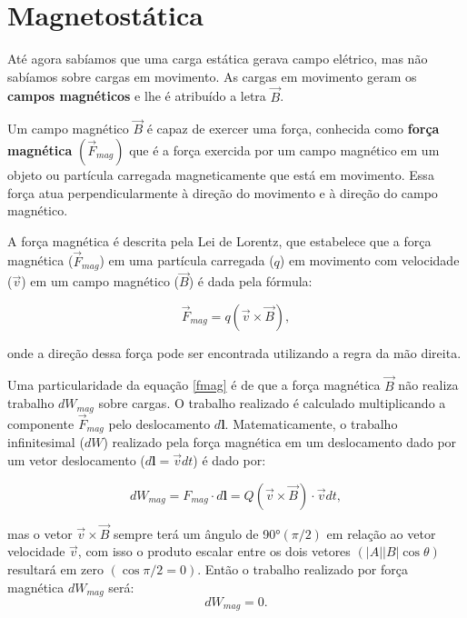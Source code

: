 \newpage\section{Magnetostática}
Até agora sabíamos que uma carga estática gerava campo elétrico, mas não sabíamos sobre cargas em movimento. As cargas em movimento geram os \textbf{campos magnéticos} e lhe é atribuído a letra $\vec{B}$. 

Um campo magnético $\vec{B}$ é capaz de exercer uma força, conhecida como \textbf{força magnética} $(\vec{F}_{mag})$ que é a força exercida por um campo magnético em um objeto ou partícula carregada magneticamente que está em movimento. Essa força atua perpendicularmente à direção do movimento e à direção do campo magnético.

A força magnética é descrita pela Lei de Lorentz, que estabelece que a força magnética ($ \vec{F}_{mag}$) em uma partícula carregada ($q$) em movimento com velocidade ($\vec{v}$) em um campo magnético ($\vec{B}$) é dada pela fórmula:

\begin{equation} \label{fmag}
    \vec{F}_{mag} = q  (\vec{v} \times\vec{B}),
\end{equation}

    onde a direção dessa força pode ser encontrada utilizando a regra da mão direita.

Uma particularidade da equação \ref{fmag} é de que a força magnética $\vec{B}$ não realiza trabalho $dW_{mag}$ sobre cargas. O trabalho realizado é calculado multiplicando a componente $\vec{F}_{mag}$ pelo deslocamento $d\mathbf{l}$. Matematicamente, o trabalho infinitesimal ($dW$) realizado pela força magnética em um deslocamento dado por um vetor deslocamento ($d\mathbf{l} = \vec{v} \textit{dt}$) é dado por:

\begin{equation}
    dW_{mag} = F_{mag} \cdot d\textbf{l} = Q(\vec{v} \times \vec{B}) \cdot \vec{v} dt,
\end{equation}

mas o vetor $\Vec{v} \times \vec{B}$ sempre terá um ângulo de 90°$(\pi / 2)$ em relação ao vetor velocidade $\vec{v}$, com isso o produto escalar entre os dois vetores $(|A||B| \cos \theta)$ resultará em zero $(\cos \pi /2 = 0)$. Então o trabalho realizado por força magnética $dW_{mag}$ será:
\begin{equation}
    dW_{mag} = 0.
\end{equation}
\newpage